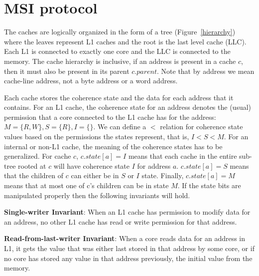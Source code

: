\section{MSI protocol}
\label{sec:GlobalMsi}


The caches are logically organized in the form of a tree
(Figure~\ref{hierarchy}) where the leaves represent L1 caches and the root is the last level cache (LLC). Each L1 is connected to exactly one core and the LLC is connected to the memory. The cache hierarchy is
inclusive, \ie if an address is present in a cache $c$, then it must also be present in its parent $c.parent$. Note that by address we mean cache-line address, not a byte address or a word address.

Each cache stores the coherence state and the data for each address that it
contains. 
For an L1 cache, the coherence state for an address denotes the
(usual) permission that a core connected to the L1 cache has for the address: $M
= \{R, W\}, S = \{R\}, I = \{\}$. We can define a $<$ relation for coherence
state values based on the permissions the states represent, that is, $I < S < M$. 
For an internal or non-L1 cache, the meaning of the coherence states has to be generalized. For cache $c$, $c.state[a] = I$ means that each cache in the entire sub-tree rooted at $c$ will have coherence state $I$ for address $a$. 
$c.state[a] = S$ means that the children of $c$ can either be in $S$ or $I$ state. Finally, $c.state[a] = M$ means that 
at most one of c's children can be in state $M$. If the state bits are manipulated properly then the following invariants will hold.

\begin{theorem}
\textbf{Single-writer Invariant}: When an L1 cache has permission to modify data for
an address, no other L1 cache has read or write permission for that address. 
\label{singleWriter}
\end{theorem}

\begin{theorem}
\textbf{Read-from-last-writer Invariant}: When a core reads data for an address
in L1, it gets the value that was either last stored in that address by some
core, or if no core has stored any value in that address previously, the
initial value from the memory.
\label{lastRead}
\end{theorem}

